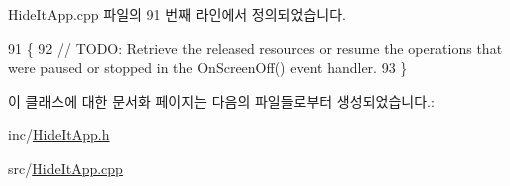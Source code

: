 Hide\+It\+App.\+cpp 파일의 91 번째 라인에서 정의되었습니다.


\begin{DoxyCode}
91                                \{
92     \textcolor{comment}{// TODO: Retrieve the released resources or resume the operations that were paused or stopped in the
       OnScreenOff() event handler.}
93 \}
\end{DoxyCode}


이 클래스에 대한 문서화 페이지는 다음의 파일들로부터 생성되었습니다.\+:\begin{DoxyCompactItemize}
\item 
inc/\hyperlink{_hide_it_app_8h}{Hide\+It\+App.\+h}\item 
src/\hyperlink{_hide_it_app_8cpp}{Hide\+It\+App.\+cpp}\end{DoxyCompactItemize}
